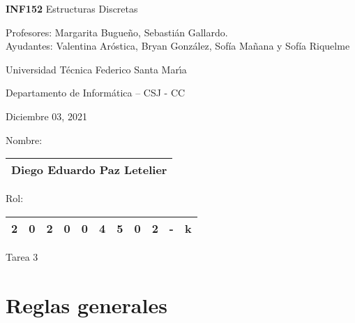 \documentclass[letterpaper,10pt]{article}
\begin{document}
\thispagestyle{empty}
 	
\begin{minipage}[t]{0.6\textwidth}

{\LARGE \textbf{INF152} Estructuras Discretas}

{\large Profesores: Margarita Bugueño, Sebastián Gallardo.}\\
{\large Ayudantes: Valentina Aróstica, Bryan González, Sofía Mañana y Sofía Riquelme}

Universidad T\'ecnica Federico Santa Mar\'{\i}a

Departamento de Inform\'atica -- CSJ - CC 

Diciembre 03, 2021

\end{minipage}
\hfill
\begin{minipage}[t]{0.3\textwidth}
Nombre:

\begin{tabular}{|c|}\hline
Diego Eduardo Paz Letelier\\\hline
\end{tabular}

\vspace{0.1cm}

Rol:

\begin{tabular}{|c|c|c|c|c|c|c|c|c|c|c|}\hline
2 & 0 & 2 & 0 & 0 & 4 & 5 & 0 & 2 & - & k\\\hline
\end{tabular}
\end{minipage}

\vspace{0.3cm}

\begin{center}
    \huge Tarea 3
\end{center}


\section{Reglas generales}

\end{document}
